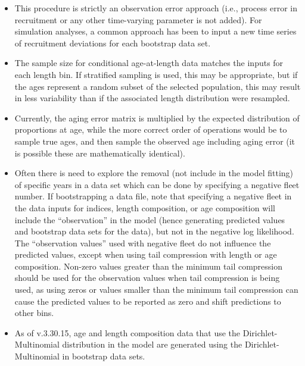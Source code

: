 \begin{itemize}

	\item This procedure is strictly an observation error approach (i.e., process error in recruitment or any other time-varying parameter is not added). For simulation analyses, a common approach has been to input a new time series of recruitment deviations for each bootstrap data set.
	
	\item The sample size for conditional age-at-length data matches the inputs for each length bin. If stratified sampling is used, this may be appropriate, but if the ages represent a random subset of the selected population, this may result in less variability than if the associated length distribution were resampled.
	
	\item Currently, the aging error matrix is multiplied by the expected distribution of proportions at age, while the more correct order of operations would be to sample true ages, and then sample the observed age including aging error (it is possible these are mathematically identical).
	
	\item Often there is need to explore the removal (not include in the model fitting) of specific years in a data set which can be done by specifying a negative fleet number. If bootstrapping a data file, note that specifying a negative fleet in the data inputs for indices, length composition, or age composition will include the ``observation'' in the model (hence generating predicted values and bootstrap data sets for the data), but not in the negative log likelihood. The ``observation values'' used with negative fleet do not influence the predicted values, except when using tail compression with length or age composition. Non-zero values greater than the minimum tail compression should be used for the observation values when tail compression is being used, as using zeros or values smaller than the minimum tail compression can cause the predicted values to be reported as zero and shift predictions to other bins.
	
	\item As of v.3.30.15, age and length composition data that use the Dirichlet-Multinomial distribution in the model are generated using the Dirichlet-Multinomial in bootstrap data sets.
	
\end{itemize}


